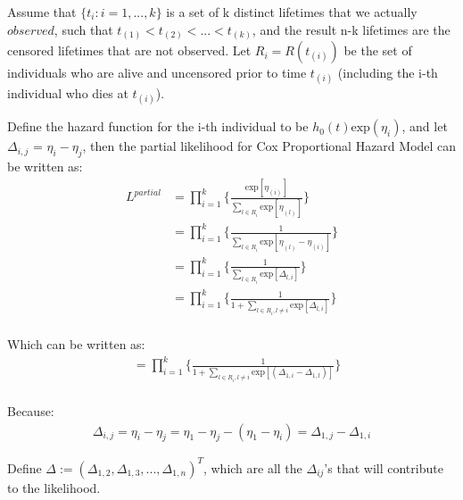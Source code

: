 \documentclass[]{article}
\begin{document}
Assume that \(\{t_i:i=1,...,k\}\) is a set of k distinct lifetimes that
we actually \(observed\), such that
\(t_{(1)} < t_{(2)} < ... <t_{(k)}\), and the result n-k lifetimes are
the censored lifetimes that are not observed. Let \(R_i = R(t_{(i)})\)
be the set of individuals who are alive and uncensored prior to time
\(t_{(i)}\) (including the i-th individual who dies at \(t_{(i)}\)).

Define the hazard function for the i-th individual to be
\(h_0(t)\text{exp}(\eta_i)\), and let \(\Delta_{i,j}\) =
\(\eta_i -\eta_j\), then the partial likelihood for Cox Proportional
Hazard Model can be written as:
\begin{equation}\begin{aligned}\label{eqn:partial}
L^{partial} &= \prod_{i=1}^{k} \bigg\{\frac{\text{exp}[\eta_{(i)}]}{{\sum_{l\in R_i}^{}\text{exp}[\eta_{(l)}]}}\bigg \} \\
         &= \prod_{i=1}^{k} \bigg\{\frac{1}{{\sum_{l\in R_i}^{}\text{exp}[\eta_{(l)}-\eta_{(i)}]}}\bigg \} \\
         &= \prod_{i=1}^{k} \bigg\{\frac{1}{{\sum_{l\in R_i}^{}\text{exp}[\Delta_{l,i}]}}\bigg \} \\
         &= \prod_{i=1}^{k} \bigg\{\frac{1}{{1 + \sum_{l\in R_i , l \neq i}^{}\text{exp}[\Delta_{l,i}]}}\bigg \} \\
\end{aligned}\end{equation}

Which can be written as:
\begin{equation}\begin{aligned}\label{eqn:partialagain}
&= \prod_{i=1}^{k} \bigg\{\frac{1}{{1 + \sum_{l\in R_i , l \neq i}^{}\text{exp}[(\Delta_{1,i}-\Delta_{1,l})]}}\bigg \} \\
\end{aligned}\end{equation}

Because: \begin{equation}\begin{aligned}\label{eqn:partialagain2}
\Delta_{i,j} = \eta_i-\eta_j = \eta_1-\eta_j-(\eta_1-\eta_i)=\Delta_{1,j}-\Delta_{1,i} 
\end{aligned}\end{equation} \newline

Define \(\Delta:=(\Delta_{1,2},\Delta_{1,3},...,\Delta_{1,n})^T\), which
are all the \(\Delta_{ij}\)'s that will contribute to the likelihood.
\newline
\end{document}

